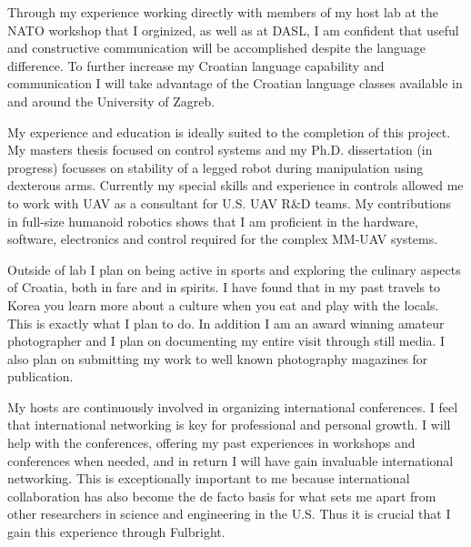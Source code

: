\documentclass[12pt]{article}
\begin{document}
Through my experience working directly with members of my host lab at the NATO workshop that I orginized, as well as at DASL, I am confident that useful and constructive communication will be accomplished despite the language difference.  
To further increase my Croatian language capability and communication I will take advantage of the Croatian language classes available in and around the University of Zagreb. 

My experience and education is ideally suited to the completion of this project.  
My masters thesis focused on control systems and my Ph.D. dissertation (in progress) focusses on stability of a legged robot during manipulation using dexterous arms.  
Currently my special skills and experience in controls allowed me to work with UAV as a consultant for U.S. UAV R\&D teams.
My contributions in full-size humanoid robotics shows that I am proficient in the hardware, software, electronics and control required for the complex MM-UAV systems.


Outside of lab I plan on being active in sports and exploring the culinary aspects of Croatia, both in fare and in spirits.  
I have found that in my past travels to Korea you learn more about a culture when you eat and play with the locals.  
This is exactly what I plan to do.  
In addition I am an award winning amateur photographer and I plan on documenting my entire visit through still media.
I also plan on submitting my work to well known photography magazines for publication.

My hosts are continuously involved in organizing international conferences.  
I feel that international networking is key for professional and personal growth.
I will help with the conferences, offering my past experiences in workshops and conferences when needed, and in return I will have gain invaluable international networking.
This is exceptionally important to me because international collaboration has also become the de facto basis for what sets me apart from other researchers in science and engineering in the U.S. 
Thus it is crucial that I gain this experience through Fulbright.
\end{document}
